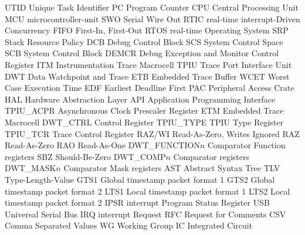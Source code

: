  {UTID} {{Unique Task Identifier}}
 {PC} {{Program Counter}}
 {CPU} {{Central Processing Unit}}
 {MCU} {{\Gls{microcontroller-unit}}}
 {SWO} {{Serial Wire Out}}
 {RTIC} {{\Gls{real-time} \Gls{interrupt}-Driven Concurrency}}
 {FIFO} {{First-In, First-Out}}
 {RTOS} {{\Gls{real-time} Operating System}}
 {SRP} {{Stack Resource Policy}}
 {DCB} {{Debug Control Block}}
 {SCS} {{System Control Space}}
 {SCB} {{System Control Block}}
 {DEMCR} {{Debug Exception and Monitor Control Register}}
 {ITM} {{Instrumentation Trace Macrocell}}
 {TPIU} {{Trace Port Interface Unit}}
 {DWT} {{Data Watchpoint and Trace}}
 {ETB} {{Embedded Trace Buffer}}
 {WCET} {{Worst Case Execution Time}}
 {EDF} {{Earliest Deadline First}}
 {PAC} {{Peripheral Access Crate}}
 {HAL} {{Hardware Abstraction Layer}}
 {API} {{Application Programming Interface}}
 {TPIU\_ACPR} {{Asynchronous Clock Prescaler Register}}
 {ETM} {{Embedded Trace Macrocell}}
 {DWT\_CTRL} {{Control Register}}
 {TPIU\_TYPE} {{TPIU Type Register}}
 {TPIU\_TCR} {{Trace Control Register}}
 {RAZ/WI} {{Read-As-Zero, Writes Ignored}}
 {RAZ} {{Read-As-Zero}}
 {RAO} {{Read-As-One}}
 {DWT\_FUNCTION$n$} {{Comparator Function registers}}
 {SBZ} {{Should-Be-Zero}}
 {DWT\_COMP$n$} {{Comparator registers}}
 {DWT\_MASK$n$} {{Comparator Mask registers}}
 {AST} {{Abstract Syntax Tree}}
 {TLV} {{Type-Length-Value}}
 {GTS1} {{Global timestamp packet format 1}}
 {GTS2} {{Global timestamp packet format 2}}
 {LTS1} {{Local timestamp packet format 1}}
 {LTS2} {{Local timestamp packet format 2}}
 {IPSR} {{\Gls{interrupt} Program Status Register}}
 {USB} {{Universal Serial Bus}}
 {IRQ} {{\Gls{interrupt} Request}}
 {RFC} {{Request for Comments}}
 {CSV} {{Comma Separated Values}}
 {WG} {{Working Group}}
 {IC} {{Integrated Circuit}}


